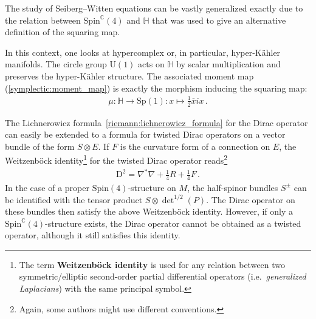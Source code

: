     \begin{remark}
        The study of Seiberg--Witten equations can be vastly generalized exactly due to the relation between $\mathrm{Spin}^{\mathbb{C}}(4)$ and $\mathbb{H}$ that was used to give an alternative definition of the squaring map.

        In this context, one looks at hypercomplex or, in particular, hyper-K\"ahler manifolds. The circle group $\mathrm{U}(1)$ acts on $\mathbb{H}$ by scalar multiplication and preserves the hyper-K\"ahler structure. The associated moment map (\cref{symplectic:moment_map}) is exactly the morphism inducing the squaring map:
        \begin{gather}
            \mu:\mathbb{H}\rightarrow\mathrm{Sp}(1):x\mapsto\frac{1}{2}\overline{x}ix\,.
        \end{gather}
    \end{remark}

    \begin{property}
        The Lichnerowicz formula~\ref{riemann:lichnerowicz_formula} for the Dirac operator can easily be extended to a formula for twisted Dirac operators on a vector bundle of the form $S\otimes E$. If $F$ is the curvature form of a connection on $E$, the Weitzenb\"ock identity\footnote{The term \textbf{Weitzenb\"ock identity} is used for any relation between two symmetric/elliptic second-order partial differential operators (i.e.~\textit{generalized Laplacians}) with the same principal symbol.} for the twisted Dirac operator reads\footnote{Again, some authors might use different conventions.}
        \begin{gather}
            \mathrm{D}^2 = \nabla^*\nabla+\frac{1}{4}R+\frac{1}{4}F\,.
        \end{gather}
        In the case of a proper $\mathrm{Spin}(4)$-structure on $M$, the half-spinor bundles $S^\pm$ can be identified with the tensor product $S\otimes\det^{1/2}(P)$. The Dirac operator on these bundles then satisfy the above Weitzenb\"ock identity. However, if only a $\mathrm{Spin}^{\mathbb{C}}(4)$-structure exists, the Dirac operator cannot be obtained as a twisted operator, although it still satisfies this identity.
    \end{property}

